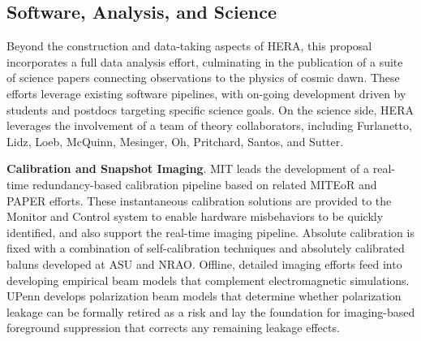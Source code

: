 \documentclass[preprint]{aastex}
\newcommand{\compress}{\vspace{-0.25in}}
\begin{document}


\compress
\subsection{Software, Analysis, and Science}
\label{sec:analysis}

Beyond the construction and data-taking aspects of HERA, this proposal
incorporates a full data analysis effort, culminating in the publication of a
suite of science papers connecting observations to the physics of cosmic dawn.
These efforts leverage existing software pipelines, with on-going 
development driven by students and postdocs targeting specific science goals.
On the science side, HERA leverages the involvement of a team of theory collaborators,
including Furlanetto, Lidz, Loeb, McQuinn, Mesinger, Oh, Pritchard, Santos, and Sutter.


{\bf Calibration and Snapshot Imaging}. MIT leads
the development of a real-time redundancy-based calibration pipeline based on related
MITEoR and PAPER efforts.
These instantaneous calibration solutions are provided to
the Monitor and Control system to enable 
hardware misbehaviors to be quickly identified, and also support the
real-time imaging pipeline.  Absolute calibration is fixed with
a combination of self-calibration techniques and absolutely calibrated baluns developed at ASU and NRAO.
Offline, detailed imaging efforts feed into developing
empirical beam models that
complement electromagnetic simulations.  UPenn develops polarization beam models
that determine whether polarization leakage can be formally retired as 
a risk and lay the foundation for imaging-based foreground suppression that
corrects any remaining leakage effects.
\end{document}
